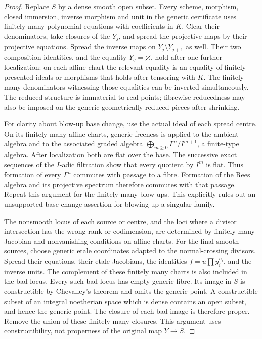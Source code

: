 \begin{proof}
Replace $S$ by a dense smooth open subset. Every scheme, morphism,
closed immersion, inverse morphism and unit in the generic certificate
uses finitely many polynomial equations with coefficients in $K$.
Clear their denominators, take closures of the $Y_j$, and spread the
projective maps by their projective equations. Spread the inverse maps
on $Y_j\setminus Y_{j+1}$ as well. Their two composition identities,
and the equality $Y_q=\varnothing$, hold after one further localization:
on each affine chart the relevant equality is an equality of finitely
presented ideals or morphisms that holds after tensoring with $K$.
The finitely many denominators witnessing those equalities can be
inverted simultaneously. The reduced structure is immaterial to real
points; fibrewise reducedness may also be imposed on the generic
geometrically reduced pieces after shrinking.

For clarity about blow-up base change, use the actual ideal of each
spread centre. On its finitely many affine charts, generic freeness \cite[Tag 051S]{Stacks} is
applied to the ambient algebra and to the associated graded algebra
$\bigoplus_{m\ge0}I^m/I^{m+1}$, a finite-type algebra. After localization
both are flat over the base. The successive exact sequences of the
$I$-adic filtration show that every quotient by $I^m$ is flat. Thus
formation of every $I^m$ commutes with passage to a fibre. Formation of
the Rees algebra and its projective spectrum therefore commutes with
that passage. Repeat this argument for the finitely many blow-ups.
This explicitly rules out an unsupported base-change assertion for
blowing up a singular family.

The nonsmooth locus of each source or centre, and the loci where a
divisor intersection has the wrong rank or codimension, are determined
by finitely many Jacobian and nonvanishing conditions on affine charts.
For the final smooth sources, choose generic etale coordinates adapted
to the normal-crossing divisors. Spread their equations, their etale
Jacobians, the identities $f=u\prod y_i^{n_i}$, and the inverse units.
The complement of these finitely many charts is also included in the
bad locus. Every such bad locus has empty generic fibre. Its image in
$S$ is constructible by Chevalley's theorem \cite[Tag 054K]{Stacks}
and omits the generic point. A constructible subset
of an integral noetherian space which is dense contains an open subset,
and hence the generic point. The closure of each bad image is therefore
proper. Remove the union of these finitely many closures. This argument
uses constructibility, not properness of the original map $Y\to S$.


\end{proof}
